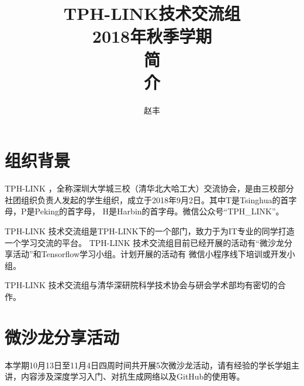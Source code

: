 \documentclass[12pt]{ctexart}
\begin{document}
\title{
    \vspace{-0.5in}
    \textmd{\textbf{\huge{TPH-LINK技术交流组}}}\\
    \normalsize\vspace{0.1in}\Large{2018年秋季学期}\\
    \vspace{1in}
     \textbf{\huge{简}}\\
    \vspace{1in}
     \textbf{\huge{介}}\\
    \vspace{1in}
}
\author{赵丰}
\maketitle
\thispagestyle{empty}
\pagebreak
\pagestyle{runningpage}
\tableofcontents

\section{组织背景}
TPH-LINK ，全称深圳大学城三校（清华北大哈工大）交流协会，是由三校部分社团组织负责人发起的学生组织，成立于2018年9月2日。其中T是Tsinghua的首字母，P是Peking的首字母， H是Harbin的首字母。微信公众号“TPH\_LINK”。

TPH-LINK 技术交流组是TPH-LINK下的一个部门，致力于为IT专业的同学打造一个学习交流的平台。
TPH-LINK 技术交流组目前已经开展的活动有“微沙龙分享活动”和Tensorflow学习小组。计划开展的活动有
微信小程序线下培训或开发小组。

TPH-LINK 技术交流组与清华深研院科学技术协会与研会学术部均有密切的合作。


\section{微沙龙分享活动}
本学期10月13日至11月4日四周时间共开展5次微沙龙活动，请有经验的学长学姐主讲，内容涉及深度学习入门、对抗生成网络以及GitHub的使用等。
\end{document}
